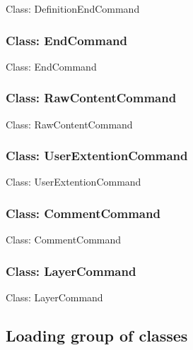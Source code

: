 \documentclass[11pt,twoside,openany,x11names,svgnames]{memoir}
\begin{document}
Class: DefinitionEndCommand

\subsubsection{Class: EndCommand}\label{Class-EndCommand}

Class: EndCommand

\subsubsection{Class: RawContentCommand}\label{Class-RawContentCommand}

Class: RawContentCommand

\subsubsection{Class: UserExtentionCommand}\label{Class-UserExtentionCommand}

Class: UserExtentionCommand

\subsubsection{Class: CommentCommand}\label{Class-CommentCommand}

Class: CommentCommand

\subsubsection{Class: LayerCommand}\label{Class-LayerCommand}

Class: LayerCommand

\subsection{Loading group of classes}\label{Loading-group-of-classes}
\end{document}
